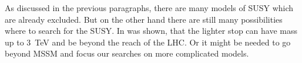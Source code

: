 As discussed in the previous paragraphs, there are many models of SUSY which are already excluded. But on the other hand there are still many possibilities where to search for the SUSY. In was shown, that the lighter stop can have mass up to 3~TeV and be beyond the reach of the LHC. Or it might be needed to go beyond MSSM and focus our searches on more complicated models.

